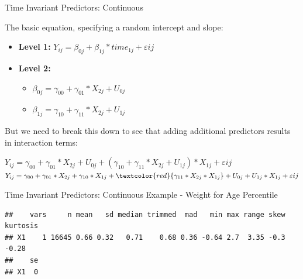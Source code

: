 \begin{frame}{Time Invariant Predictors: Continuous}

The basic equation, specifying a random intercept and slope:\\

\begin{itemize}
  \item \textbf{Level 1:} $Y_{ij} = \beta_{0j} + \beta_{1j}*time_{1j} + \varepsilon{ij}$
  \item \textbf{Level 2:} 
    \begin{itemize} 
      \item $\beta_{0j} = \gamma_{00} + \gamma_{01}*X_{2j} + U_{0j}$
      \item $\beta_{1j} = \gamma_{10} + \gamma_{11}*X_{2j} + U_{1j}$
    \end{itemize}
\end{itemize}

But we need to break this down to see that adding additional predictors
results in interaction terms:

\(Y_{ij} = \gamma_{00} + \gamma_{01}*X_{2j} + U_{0j} + (\gamma_{10} + \gamma_{11}*X_{2j} + U_{1j})*X_{1j} + \varepsilon{ij}\)
\(Y_{ij} = \gamma_{00} + \gamma_{01}*X_{2j} + \gamma_{10}*X_{1j} + \textcolor{red}{\gamma_{11}*X_{2j}*X_{1j}} + U_{0j} + U_{1j}*X_{1j} + \varepsilon{ij}\)

\end{frame}

\begin{frame}[fragile]{Time Invariant Predictors: Continuous Example -
Weight for Age Percentile}

\begin{Shaded}
\begin{Highlighting}[]
\OperatorTok{$}
\end{Highlighting}
\end{Shaded}

\footnotesize

\begin{verbatim}
##    vars     n mean   sd median trimmed  mad   min max range skew kurtosis
## X1    1 16645 0.66 0.32   0.71    0.68 0.36 -0.64 2.7  3.35 -0.3    -0.28
##    se
## X1  0
\end{verbatim}

\normalsize

\end{frame}

